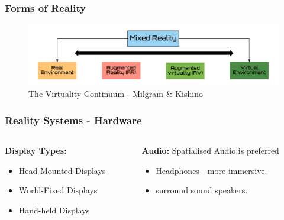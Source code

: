 \begin{frame}
	\frametitle{Forms of Reality}
	\begin{figure}
		\includegraphics[scale=.2]{assets/continuum.png}
		\caption{The Virtuality Continuum - Milgram \& Kishino}
	\end{figure}
\end{frame}


\begin{frame}
	\frametitle{Reality Systems - Hardware}
	
	\begin{columns}
		
		\begin{column}{0.5\textwidth}
			\textbf{Display Types:}
			\begin{itemize}
				\item Head-Mounted Displays
				\item World-Fixed Displays
				\item Hand-held Displays
			\end{itemize}
		\end{column}
		
		\begin{column}{0.5\textwidth}

			\textbf{Audio:}
			Spatialised Audio is preferred
			\begin{itemize}
				\item Headphones - more immersive.
				\item surround sound speakers.
			\end{itemize}
			
		\end{column}
		
	\end{columns}
\end{frame}

